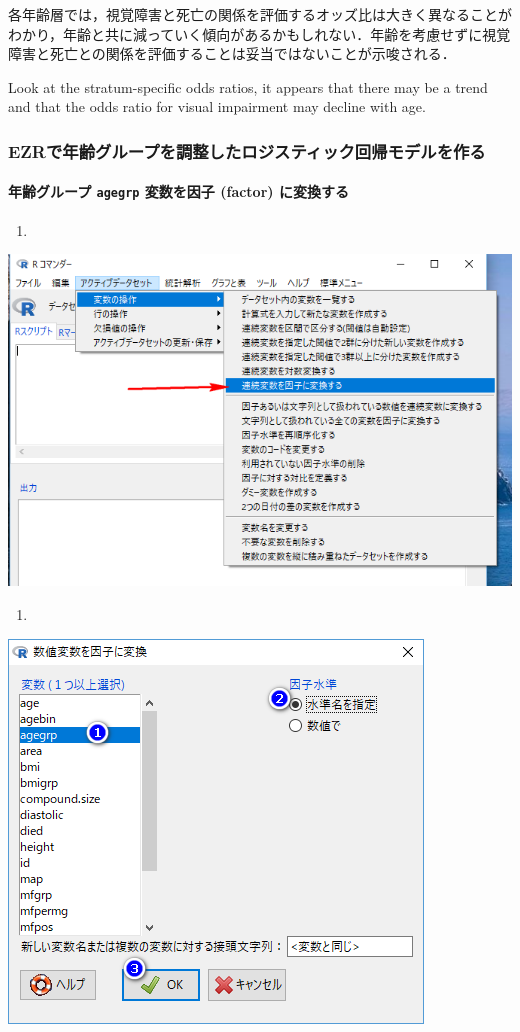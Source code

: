 \documentclass[]{problemset}
\let\oldparagraph\paragraph
\renewcommand{\paragraph}[1]{\oldparagraph{#1}\mbox{}}
\begin{document}
各年齢層では，視覚障害と死亡の関係を評価するオッズ比は大きく異なることがわかり，年齢と共に減っていく傾向があるかもしれない．年齢を考慮せずに視覚障害と死亡との関係を評価することは妥当ではないことが示唆される．

Look at the stratum-specific odds ratios, it appears that there may be a
trend and that the odds ratio for visual impairment may decline with
age.

\newpage
\vfill

\hypertarget{ezr}{%
\subsubsection{EZRで年齢グループを調整したロジスティック回帰モデルを作る}\label{ezr}}

\hypertarget{-agegrp--factor-}{%
\paragraph{\texorpdfstring{年齢グループ \texttt{agegrp} 変数を因子
(factor)
に変換する}{年齢グループ agegrp 変数を因子 (factor) に変換する}}\label{-agegrp--factor-}}

\begin{enumerate}
\def\labelenumi{\arabic{enumi}.}
\item
\end{enumerate}

\begin{center}\includegraphics[width=0.55\linewidth,height=0.5\textheight]{pic/mltlogstic00} \end{center}

\begin{enumerate}
\def\labelenumi{\arabic{enumi}.}
\setcounter{enumi}{1}
\item
\end{enumerate}

\begin{center}\includegraphics[width=0.55\linewidth,height=0.5\textheight]{pic/mltlogstic01} \end{center}
\end{document}
